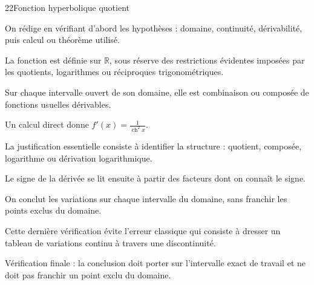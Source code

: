 \documentclass[11pt,a4paper]{article}
\newcommand{\R}{\mathbb{R}}
\newcommand{\ch}{\operatorname{ch}}
\begin{document}
\begin{corrbox}{22}{Fonction hyperbolique quotient}

\begin{methodebox}
On rédige en vérifiant d'abord les hypothèses : domaine, continuité, dérivabilité, puis calcul ou théorème utilisé.
\end{methodebox}

La fonction est définie sur $\R$, sous réserve des restrictions évidentes imposées par les quotients, logarithmes ou réciproques trigonométriques.


Sur chaque intervalle ouvert de son domaine, elle est combinaison ou composée de fonctions usuelles dérivables.


Un calcul direct donne $f'(x)=\frac{1}{\ch^2x}$.


La justification essentielle consiste à identifier la structure : quotient, composée, logarithme ou dérivation logarithmique.


Le signe de la dérivée se lit ensuite à partir des facteurs dont on connaît le signe.


On conclut les variations sur chaque intervalle du domaine, sans franchir les points exclus du domaine.


Cette dernière vérification évite l'erreur classique qui consiste à dresser un tableau de variations continu à travers une discontinuité.


\begin{attentionbox}
Vérification finale : la conclusion doit porter sur l'intervalle exact de travail et ne doit pas franchir un point exclu du domaine.
\end{attentionbox}

\end{corrbox}
\end{document}
